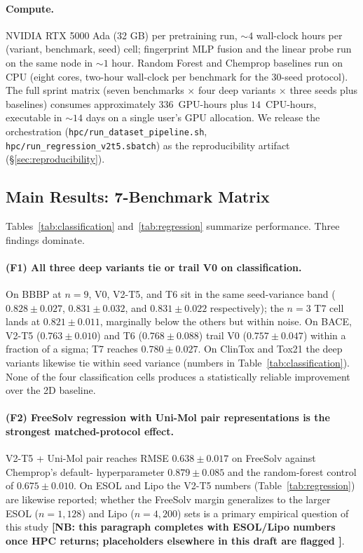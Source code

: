\paragraph{Compute.} NVIDIA RTX 5000 Ada (32 GB) per pretraining run,
$\sim 4$ wall-clock hours per (variant, benchmark, seed) cell;
fingerprint MLP fusion and the linear probe run on the same node in
$\sim 1$ hour. Random Forest and Chemprop baselines run on CPU
(eight cores, two-hour wall-clock per benchmark for the 30-seed protocol).
The full sprint matrix (seven benchmarks $\times$ four deep variants
$\times$ three seeds plus baselines) consumes approximately
$336$~GPU-hours plus $14$~CPU-hours, executable in $\sim 14$ days on a
single user's GPU allocation. We release the orchestration
(\texttt{hpc/run\_dataset\_pipeline.sh},
\texttt{hpc/run\_regression\_v2t5.sbatch}) as the reproducibility
artifact (\S\ref{sec:reproducibility}).

\subsection{Main Results: 7-Benchmark Matrix}
\label{sec:main-results}


Tables~\ref{tab:classification} and~\ref{tab:regression} summarize
performance. Three findings dominate.

\paragraph{(F1) All three deep variants tie or trail V0 on
classification.} On BBBP at $n{=}9$, V0, V2-T5, and T6 sit in the same
seed-variance band ($0.828 \pm 0.027$, $0.831 \pm 0.032$, and
$0.831 \pm 0.022$ respectively); the $n{=}3$ T7 cell lands at
$0.821 \pm 0.011$, marginally below the others but within noise. On BACE,
V2-T5 ($0.763 \pm 0.010$) and T6 ($0.768 \pm 0.088$) trail V0
($0.757 \pm 0.047$) within a fraction of a sigma; T7 reaches
$0.780 \pm 0.027$. On ClinTox and Tox21 the deep variants likewise tie
within seed variance (numbers in Table~\ref{tab:classification}). None of
the four classification cells produces a statistically reliable
improvement over the 2D baseline.

\paragraph{(F2) FreeSolv regression with Uni-Mol pair representations is
the strongest matched-protocol effect.} V2-T5 + Uni-Mol pair reaches
RMSE $0.638 \pm 0.017$ on FreeSolv against Chemprop's default-
hyperparameter $0.879 \pm 0.085$ and the random-forest control of
$0.675 \pm 0.010$. On ESOL and Lipo the V2-T5 numbers
(Table~\ref{tab:regression}) are likewise reported; whether the FreeSolv
margin generalizes to the larger ESOL ($n{=}1{,}128$) and Lipo
($n{=}4{,}200$) sets is a primary empirical question of this study
\textbf{[NB: this paragraph completes with ESOL/Lipo numbers once HPC
returns; placeholders elsewhere in this draft are flagged
\PLACEHOLDER]}.

